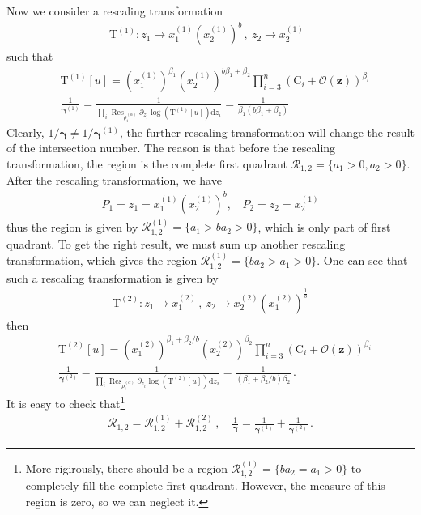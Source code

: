 \documentclass[a4paper,11pt]{article}
\newcommand{\nn}{\nonumber}
\newcommand{\nd}{\mathrm{d}}
\newcommand{\nT}{\mathrm{T}}
\newcommand{\bea}{\begin{eqnarray}}
\newcommand{\eea}{\end{eqnarray}}
\DeclareMathOperator{\Res}{Res}
\begin{document}
Now we consider a rescaling transformation
\begin{align}
	\nT^{(1)}: z_1\to x^{(1)}_1 \left(x^{(1)}_2\right)^b \,, \ z_2\to x^{(1)}_2   ~~~\label{rescale-1-2}
\end{align}
such that 
\begin{align}
	&\nT^{(1)}[u] = \left(x^{(1)}_1\right)^{\beta_1}  \left(x^{(1)}_2\right)^{b\beta_1 + \beta_2}\prod_{i=3}^n (\text{C}_i+\mathcal{O}(\bm{z}))^{\beta_i} \nn\\
	&\frac{1}{\bm{\gamma}^{(1)}} =  \frac{1}{ \prod_{i} \Res_{\rho^{(\alpha)}_i} \partial_{z_i} \log\left(\nT^{(1)}\left[u \right] \right) \nd z_i} = \frac{1}{\beta_1(b\beta_1 + \beta_2)} \label{eq:overfactorized1}
\end{align}
Clearly, $1/\bm{\gamma} \neq 1/ \bm{\gamma}^{(1)}$, the further rescaling transformation will change the result of the intersection number. The reason is that before the rescaling transformation, the region is the complete first quadrant $\mathcal{R}_{1,2}=\{a_1>0,a_2>0\} $. After the rescaling transformation, we have 
%
\bea P_1=z_1= x^{(1)}_1 \left(x^{(1)}_2\right)^b,~~~~P_2=z_2=x^{(1)}_2 \eea
%
thus the region is given by 
$\mathcal{R}_{1,2}^{(1)}=\{a_1>ba_2>0\} $, which is only part of first quadrant. To get the right result, we must
sum up another rescaling transformation, which gives the region  $\mathcal{R}_{1,2}^{(1)}=\{ba_2>a_1>0\} $. One can see that such a rescaling transformation is given by 
\begin{align}
	\nT^{(2)}: z_1\to x^{(2)}_1  \,, \ z_2\to x^{(2)}_2\left(x^{(2)}_1\right)^{\frac{1}{b}}   
\end{align}
then
\begin{align}
	&\nT^{(2)}[u] = \left(x^{(2)}_1\right)^{\beta_1+\beta_2/b}  \left(x^{(2)}_2\right)^{\beta_2}\prod_{i=3}^n (\text{C}_i+\mathcal{O}(\bm{z}))^{\beta_i} \nn\\
	&\frac{1}{\bm{\gamma}^{(2)}} =  \frac{1}{ \prod_{i} \Res_{\rho^{(\alpha)}_i} \partial_{z_i} \log\left(\nT^{(2)}\left[u \right] \right) \nd z_i} = \frac{1}{(\beta_1 + \beta_2/b)\beta_2} \, .
\end{align}
It is easy to check that\footnote{More rigirously, there should be  a region $\mathcal{R}_{1,2}^{(1)}=\{ba_2=a_1>0\} $ to completely fill the complete first quadrant. However, the measure of this region is zero, so we can neglect it.}
\begin{align}
	\mathcal{R}_{1,2} = \mathcal{R}^{(1)}_{1,2} +\mathcal{R}^{(2)}_{1,2} \, , \quad \frac{1}{\bm{\gamma}} = \frac{1}{\bm{\gamma}^{(1)}} +\frac{1}{\bm{\gamma}^{(2)}}  \, .   \label{eq:regionrule}
\end{align}
\end{document}
